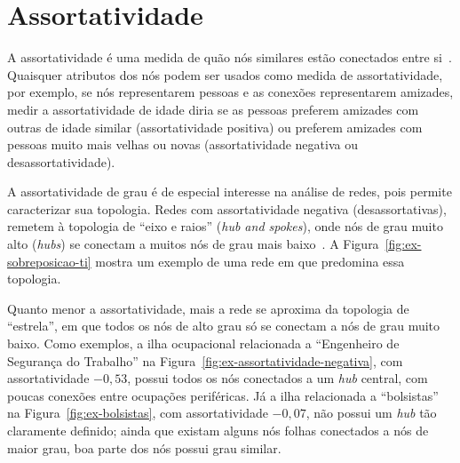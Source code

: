 \documentclass[
  article,
  11pt,
  a4paper,
  english,
  brazil,
  sumario=tradicional]{abntex2}
\begin{document}
\section{Assortatividade} \label{sec:assortatividade}

A assortatividade é uma medida de quão nós similares estão conectados entre si~\cite{Newman2003-jn}. Quaisquer atributos dos nós podem ser usados como medida de assortatividade, por exemplo, se nós representarem pessoas e as conexões representarem amizades, medir a assortatividade de idade diria se as pessoas preferem amizades com outras de idade similar (assortatividade positiva) ou preferem amizades com pessoas muito mais velhas ou novas (assortatividade negativa ou desassortatividade).

A assortatividade de grau é de especial interesse na análise de redes, pois permite caracterizar sua topologia. Redes com assortatividade negativa (desassortativas), remetem à topologia de \enquote{eixo e raios} (\textit{hub and spokes}), onde nós de grau muito alto (\textit{hubs}) se conectam a muitos nós de grau mais baixo~\cite{Barabasi2016-rn}. A Figura~\ref{fig:ex-sobreposicao-ti} mostra um exemplo de uma rede em que predomina essa topologia.

Quanto menor a assortatividade, mais a rede se aproxima da topologia de \enquote{estrela}, em que todos os nós de alto grau só se conectam a nós de grau muito baixo. Como exemplos, a ilha ocupacional relacionada a \enquote{Engenheiro de Segurança do Trabalho} na Figura~\ref{fig:ex-assortatividade-negativa}, com assortatividade $-0,53$, possui todos os nós conectados a um \textit{hub} central, com poucas conexões entre ocupações periféricas. Já a ilha relacionada a \enquote{bolsistas} na Figura~\ref{fig:ex-bolsistas}, com assortatividade $-0,07$, não possui um \textit{hub} tão claramente definido; ainda que existam alguns nós folhas conectados a nós de maior grau, boa parte dos nós possui grau similar.
\end{document}
